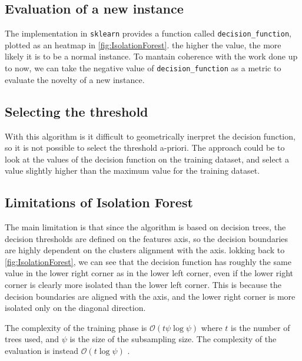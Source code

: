 \subsection{Evaluation of a new instance}
\label{sec:iforest_eval}
The implementation in \texttt{sklearn} provides a function called \texttt{decision\_function}, plotted as an heatmap in \autoref{fig:IsolationForest}. the higher the value, the more likely it is to be a normal instance.
To mantain coherence with the work done up to now, we can take the negative value of \texttt{decision\_function} as a metric to evaluate the novelty of a new instance.

\subsection{Selecting the threshold}
\label{sec:iforest_threshold}
With this algorithm is it difficult to geometrically inerpret the decision function, so it is not possible to select the threshold a-priori. The approach could be to look at the values of the decision function on the training dataset, and select a value slightly higher than the maximum value for the training dataset.

\subsection{Limitations of Isolation Forest}
The main limitation is that since the algorithm is based on decision trees, the decision thresholds are defined on the features axis, so the decision boundaries are highly dependent on the clusters alignment with the axis. lokking back to \autoref{fig:IsolationForest}, we can see that the decision function has roughly the same value in the lower right corner as in the lower left corner, even if the lower right corner is clearly more isolated than the lower left corner. This is because the decision boundaries are aligned with the axis, and the lower right corner is more isolated only on the diagonal direction.

The complexity of the training phase is $\mathcal{O}(t\psi\log\psi)$ where $t$ is the number of trees used, and $\psi$ is the size of the subsampling size. The complexity of the evaluation is instead $\mathcal{O}(t\log\psi)$ \cite{iforest}.